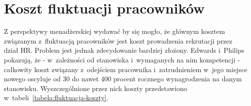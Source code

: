 \section{Koszt fluktuacji pracowników}\label{sec:koszt-fluktuacji}

Z perspektywy menadżerskiej wydawać by się mogło, że głównym kosztem związanym z~fluktuacją pracowników jest koszt prowadzenia rekrutacji przez dział HR.
Problem jest jednak zdecydowanie bardziej złożony.
Edwards i~Philips pokazują, że - w~zależności od stanowiska i~wymaganych na nim kompetencji -
całkowity koszt związany z~odejściem pracownika i~zatrudnieniem w~jego miejsce nowego oscyluje od 30 do nawet 400 procent
rocznego wynagrodzenia na danym stanowisku. Wyszczególnione przez nich koszty przedstawiono w~tabeli~\ref{tabela:fluktuacja-koszty}.

